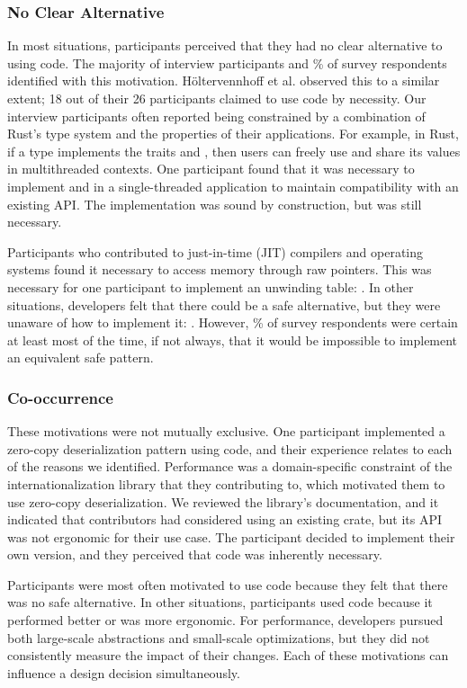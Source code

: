 \subsubsection{No Clear Alternative}
In most situations, participants perceived that they had no clear alternative to using \unsafe code. The majority of interview participants and \% of survey respondents identified with this motivation. Höltervennhoff et al.\cite{holtervennhoff23} observed this to a similar extent; 18 out of their 26 participants claimed to use \unsafe code by necessity. Our interview participants often reported being constrained by a combination of Rust's type system and the properties of their applications. For example, in Rust, if a type implements the \unsafe traits  and , then users can freely use and share its values in multithreaded contexts. One participant found that it was necessary to implement  and  in a single-threaded application to maintain compatibility with an existing API. The implementation was sound by construction, but \unsafe was still necessary.

Participants who contributed to just-in-time (JIT) compilers and operating systems found it necessary to access memory through raw pointers. This was necessary for one participant to implement an unwinding table: . In other situations, developers felt that there could be a safe alternative, but they were unaware of how to implement it: . However, \impossible\% of survey respondents were certain at least most of the time, if not always, that it would be impossible to implement an equivalent safe pattern.

\subsubsection{Co-occurrence} These motivations were not mutually exclusive. One participant implemented a zero-copy deserialization pattern using \unsafe code, and their experience relates to each of the reasons we identified. Performance was a domain-specific constraint of the internationalization library that they contributing to, which motivated them to use zero-copy deserialization. We reviewed the library's documentation, and it indicated that contributors had considered using an existing crate, but its API was not ergonomic for their use case. The participant decided to implement their own version, and they perceived that \unsafe code was inherently necessary.

\label{response:rq1}
\rsqtwo Participants were most often motivated to use \unsafe code because they felt that there was no safe alternative. In other situations, participants used \unsafe code because it performed better or was more ergonomic. For performance, developers pursued both large-scale abstractions and small-scale optimizations, but they did not consistently measure the impact of their changes. Each of these motivations can influence a design decision simultaneously.